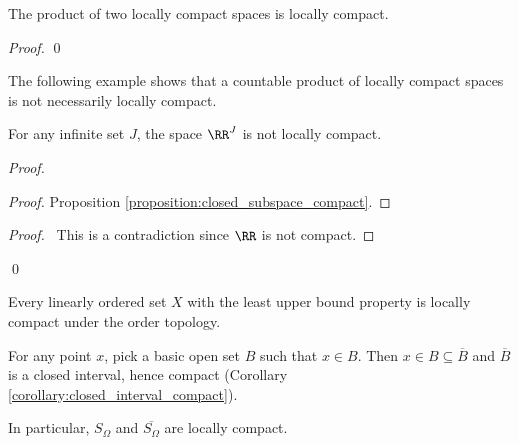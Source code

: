 \begin{proposition}
    The product of two locally compact spaces is locally compact.
\end{proposition}

\begin{proof}
    \pf
    \qed
\end{proof}

The following example shows that a countable product of locally compact spaces
is not necessarily locally compact.

\begin{proposition}
    For any infinite set $J$, the space $\RR^J$ is not locally compact.
\end{proposition}

\begin{proof}
    \pf
    \begin{proof}
        \pf Proposition \ref{proposition:closed_subspace_compact}.
    \end{proof}
    \qedstep
    \begin{proof}
        \pf\ This is a contradiction since $\RR$ is not compact.
    \end{proof}
    \qed
\end{proof}

\begin{example}
    Every linearly ordered set $X$ with the least upper bound property is locally
    compact under the order topology.

    For any point $x$, pick a basic open set $B$ such that $x \in B$. Then
    $x \in B \subseteq \overline{B}$ and $\overline{B}$ is a closed interval,
    hence compact (Corollary \ref{corollary:closed_interval_compact}).

    In particular, $S_\Omega$ and $\overline{S_\Omega}$ are locally compact.
\end{example}

